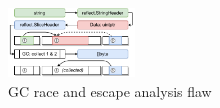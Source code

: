 \begin{figure}[!t]
    \centering
    \includegraphics[width=0.3\textwidth]{gfx/figures/gcrace-vuln-pdf.pdf}
    \caption{GC race and escape analysis flaw}
    \label{fig:gcrace-vuln}
    \vspace{-9pt}
\end{figure}
